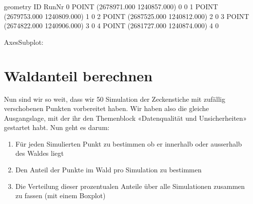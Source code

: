 \documentclass[letterpaper,10pt,english]{sphinxmanual}
\begin{document}
\begin{sphinxVerbatim}[commandchars=\\\{\}]
\end{sphinxVerbatim}

\begin{sphinxVerbatim}[commandchars=\\\{\}]
                          geometry  ID  Run\PYGZus{}Nr
0  POINT (2678971.000 1240857.000)   0       0
1  POINT (2679753.000 1240809.000)   1       0
2  POINT (2687525.000 1240812.000)   2       0
3  POINT (2674822.000 1240906.000)   3       0
4  POINT (2681727.000 1240874.000)   4       0
\end{sphinxVerbatim}

\begin{sphinxVerbatim}[commandchars=\\\{\}]
  
\end{sphinxVerbatim}

\begin{sphinxVerbatim}[commandchars=\\\{\}]
\PYGZlt{}AxesSubplot:\PYGZgt{}
\end{sphinxVerbatim}

\begin{sphinxVerbatim}[commandchars=\\\{\}]
\end{sphinxVerbatim}


\chapter{Waldanteil berechnen}
\label{\detokenize{03_04_Waldanteil_Berechnen:waldanteil-berechnen}}\label{\detokenize{03_04_Waldanteil_Berechnen::doc}}
Nun sind wir so weit, dass wir 50 Simulation der Zeckenstiche mit zufällig verschobenen Punkten vorbereitet haben. Wir haben also die gleiche Ausgangslage, mit der ihr den Themenblock «Datenqualität und Unsicherheiten» gestartet habt. Nun geht es darum:
\begin{enumerate}
%
\item {} 
Für jeden Simulierten Punkt zu bestimmen ob er innerhalb oder ausserhalb des Waldes liegt

\item {} 
Den Anteil der Punkte im Wald pro Simulation zu bestimmen

\item {} 
Die Verteilung dieser prozentualen Anteile über alle Simulationen zusammen zu fassen (mit einem Boxplot)

\end{enumerate}
\end{document}
